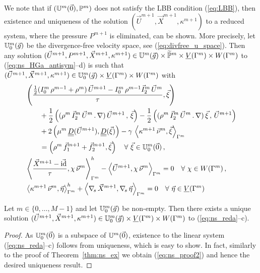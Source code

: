 We note that if $(\uspacedisc{0}{m},\pspace^m)$ does not satisfy the LBB
condition (\ref{eq:LBB}), then existence and uniqueness of the solution
$(\vec U^{m+1},\vec X^{m+1},\kappa^{m+1})$ to a reduced system, where the
pressure $P^{m+1}$ is eliminated, can be shown. More precisely, let
$\uspacesimple^m_0(\vec g)$ be the divergence-free velocity space, see
(\ref{eq:divfree_u_space}). Then any solution $(\vec U^{m+1}, P^{m+1}, \vec
X^{m+1}, \kappa^{m+1}) \in \uspacedisc{g}{m}\times \pnormspace^m \times \Vh
\times \Wh$ to (\ref{eq:ns_HGa_antisym}--d) is such that $(\vec U^{m+1}, \vec
X^{m+1}, \kappa^{m+1}) \in \uspacesimple^m_0(\vec g)\times \Vh \times \Wh$ with
\begin{subequations}
\begin{align}
& \left(\frac{\tfrac{1}{2}(I^m_0\,\rho^{m-1}+\rho^m)\,\vec U^{m+1} -
I^m_0\,\rho^{m-1} \vec I^m_2\,\vec U^m}{\tau}, \vec \xi \right)\nonumber \\
& \qquad + \frac{1}{2}\left((\rho^m\,\vec I^m_2\,\vec U^m\,.\,\nabla)\,
\vec U^{m+1}\,,\,\vec \xi \right) - \frac{1}{2} \left((\rho^m\,
\vec I^m_2 \, \vec U^m\,.\,\nabla)\,\vec \xi\,,\,\vec U^{m+1} \right)
\nonumber \\
& \qquad + 2\left(\mu^m\,\mat D(\vec U^{m+1}), \mat D(\vec \xi) \right)
- \gamma\,\left\langle \kappa^{m+1}\,\vec\nu^m,\vec\xi\right\rangle_{\Gamma^m}
\nonumber \\
& \qquad = \left(\rho^m\,\vec f_1^{m+1}+\vec f_2^{m+1},\vec \xi\right)
\quad \forall\ \vec\xi \in \uspacesimple^m_0(\vec 0)\,, \label{eq:ns_reda}\\
&  \left\langle \frac{\vec X^{m+1} - \vec\id}{\tau} ,\chi\,\vec\nu^m
\right\rangle_{\Gamma^m}^h - \left\langle \vec U^{m+1}, \chi\,\vec\nu^m
\right\rangle_{\Gamma^m}  = 0 \quad \forall\ \chi \in \Wh\,,
\label{eq:ns_redb} \\
& \left\langle \kappa^{m+1}\,\vec\nu^m, \vec\eta \right\rangle_{\Gamma^m}^h
+ \left\langle \nabs\,\vec X^{m+1}, \nabs\,\vec \eta \right\rangle_{\Gamma^m} =
0 \quad \forall\ \vec\eta \in \Vh \label{eq:ns_redc}
\end{align}
\end{subequations}

\begin{theorem} \label{thm:ns_stabreduced}
Let $m \in \{0,\ldots,M-1\}$ and let $\uspacesimple^m_0(\vec g)$ be non-empty.
Then there exists a unique solution $(\vec U^{m+1}, \vec X^{m+1}, \kappa^{m+1})
\in \uspacesimple^m_0(\vec g) \times \Vh \times \Wh$ to (\ref{eq:ns_reda}--c).
\end{theorem}
\begin{proof}
As $\uspacesimple^m_0(\vec 0)$ is a subspace of $\uspacedisc{0}{m}$,
existence to the linear system (\ref{eq:ns_reda}--c) follows from uniqueness,
which is easy to show. In fact, similarly to the proof of
Theorem~\ref{thm:ns_ex} we obtain (\ref{eq:ns_proof2}) and hence the desired
uniqueness result.
\end{proof}

